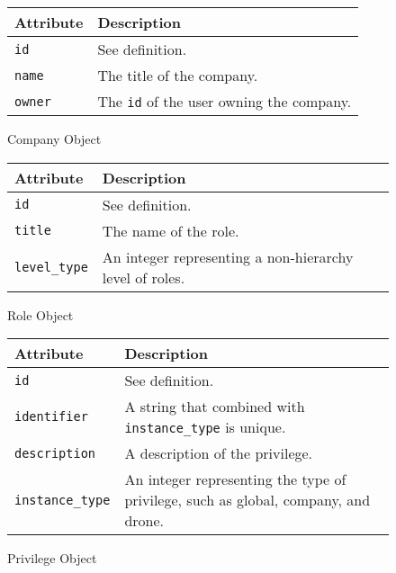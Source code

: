 \begin{figure}[htb]
\begin{center}
\begin{tabular}{ | l | p{8cm} | }
  \hline
    \textbf{Attribute} & \textbf{Description} \\ \hline
    \verb+id+ & See definition. \\ \hline
    \verb+name+ & The title of the company.\\ \hline
    \verb+owner+ & The \verb+id+ of the user owning the company.\\ \hline
\end{tabular}
\caption{Company Object}
\label{tab:company_object}
\end{center}
\end{figure}

\begin{figure}[htb]
\begin{center}
\begin{tabular}{ | l | p{8cm} | }
  \hline
    \textbf{Attribute} & \textbf{Description} \\ \hline
    \verb+id+ & See definition.\\ \hline
    \verb+title+ & The name of the role.\\ \hline
    \verb+level_type+ & An integer representing a non-hierarchy level of roles.\\ \hline
\end{tabular}
\caption{Role Object}
\label{tab:role_object}
\end{center}
\end{figure}

\begin{figure}[htb]
\begin{center}
\begin{tabular}{ | l | p{8cm} | }
  \hline
    \textbf{Attribute} & \textbf{Description} \\ \hline
    \verb+id+ & See definition.\\ \hline
    \verb+identifier+ & A string that combined with \verb+instance_type+ is unique.\\ \hline
    \verb+description+ & A description of the privilege.\\ \hline
    \verb+instance_type+ & An integer representing the type of privilege, such as global, company, and drone.\\ \hline
\end{tabular}
\caption{Privilege Object}
\label{tab:privilege_object}
\end{center}
\end{figure}

